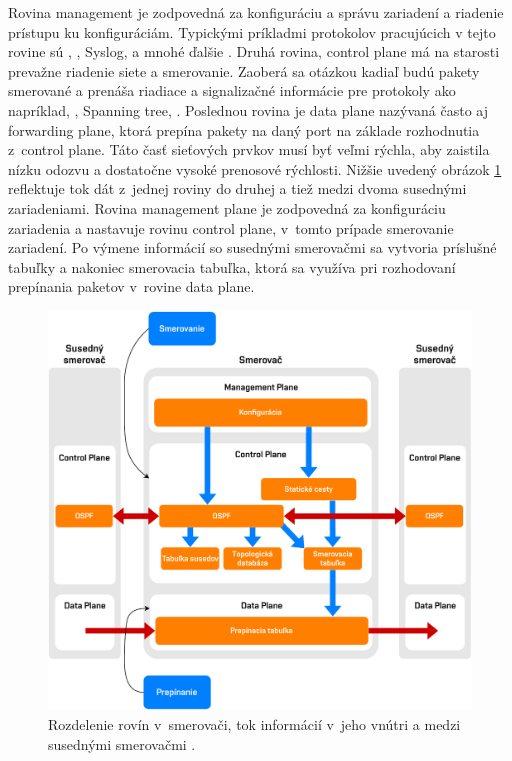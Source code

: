 Rovina management je zodpovedná za konfiguráciu a správu zariadení a riadenie prístupu ku konfiguráciám. Typickými príkladmi protokolov pracujúcich v tejto rovine sú , , Syslog,  a mnohé ďalšie \cite{Singh2018}. Druhá rovina, control plane má na starosti prevažne riadenie siete a smerovanie. Zaoberá sa otázkou kadiaľ budú pakety smerované a prenáša riadiace a signalizačné informácie pre protokoly ako napríklad, , Spanning tree,  \cite{Singh2018}. Poslednou rovina je data plane nazývaná často aj forwarding plane, ktorá prepína pakety na daný port na základe rozhodnutia z~control plane. Táto časť sieťových prvkov musí byť veľmi rýchla, aby zaistila nízku odozvu a dostatočne vysoké prenosové rýchlosti. Nižšie uvedený obrázok \ref{fig:sdn-planes} reflektuje tok dát z~jednej roviny do druhej a tiež medzi dvoma susednými zariadeniami. Rovina management plane je zodpovedná za konfiguráciu zariadenia a nastavuje rovinu control plane, v~tomto prípade smerovanie zariadení. Po výmene informácií so susednými smerovačmi sa vytvoria príslušné tabuľky a nakoniec smerovacia tabuľka, ktorá sa využíva pri rozhodovaní prepínania paketov v~rovine data plane.

\begin{figure}[H]
	\begin{center}
		\includegraphics[scale=0.6]{obrazky/SDN_planes.pdf}
	\end{center}
	\caption[Rozdelenie rovín v~smerovači]{Rozdelenie rovín v~smerovači, tok informácií v~jeho vnútri a medzi susednými smerovačmi \cite{Pepelnjak2013}.}
	\label{fig:sdn-planes}
\end{figure} 


